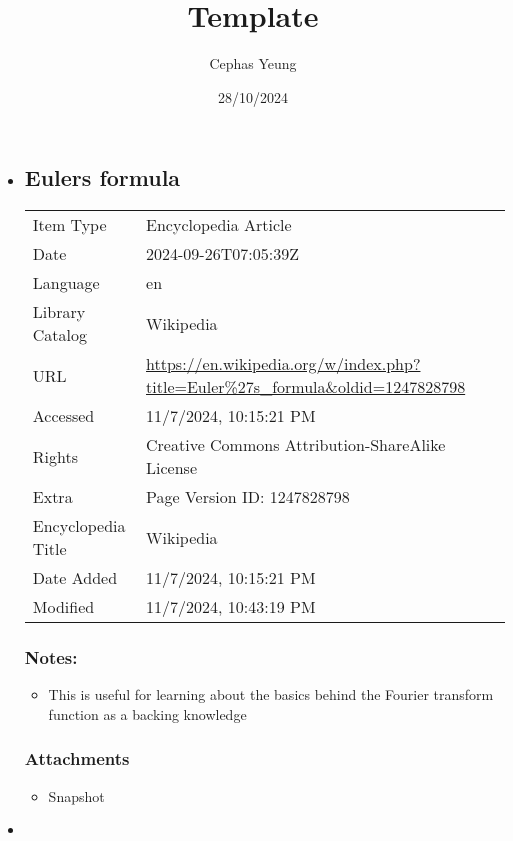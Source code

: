 \documentclass[twoside]{report}
\title{Template}
\author{Cephas Yeung}
\date{28/10/2024}
\begin{document}
\begin{itemize}
\item
  \label{item_S93N584M}
  \subsection{Euler\textquotesingle s formula}\label{eulers-formula}

  \begin{longtable}[]{@{}ll@{}}
  \toprule\noalign{}
  \endhead
  \bottomrule\noalign{}
  \endlastfoot
  Item Type & Encyclopedia Article \\
  Date & 2024-09-26T07:05:39Z \\
  Language & en \\
  Library Catalog & Wikipedia \\
  URL &
  \url{https://en.wikipedia.org/w/index.php?title=Euler\%27s_formula&oldid=1247828798} \\
  Accessed & 11/7/2024, 10:15:21 PM \\
  Rights & Creative Commons Attribution-ShareAlike License \\
  Extra & Page Version ID: 1247828798 \\
  Encyclopedia Title & Wikipedia \\
  Date Added & 11/7/2024, 10:15:21 PM \\
  Modified & 11/7/2024, 10:43:19 PM \\
  \end{longtable}

  \subsubsection{Notes:}\label{notes}

  \begin{itemize}
  \item
    \label{item_ZMHWSIRK}
    This is useful for learning about the basics behind the Fourier
    transform function as a backing knowledge
  \end{itemize}

  \subsubsection{Attachments}\label{attachments}

  \begin{itemize}
  \tightlist
  \item
    \label{item_UTDLGEQL}{Snapshot}
  \end{itemize}
\item
  \label{item_INLNF82T}

\end{itemize}
\end{document}
